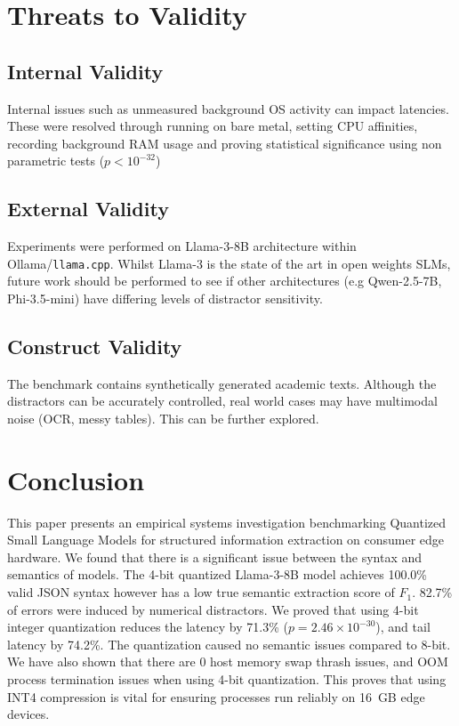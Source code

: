 \documentclass[conference]{IEEEtran}
\begin{document}
{\section{Threats to Validity}
\label{sec:validity}

\subsection{Internal Validity}
Internal issues such as unmeasured background OS activity can impact latencies. These were resolved through running on bare metal, setting CPU affinities, recording background RAM usage and proving statistical significance using non parametric tests ($p < 10^{-32}$)

\subsection{External Validity}
Experiments were performed on Llama-3-8B architecture within Ollama/\texttt{llama.cpp}. Whilst Llama-3 is the state of the art in open weights SLMs, future work should be performed to see if other architectures (e.g Qwen-2.5-7B, Phi-3.5-mini) have differing levels of distractor sensitivity.

\subsection{Construct Validity}
The benchmark contains synthetically generated academic texts. Although the distractors can be accurately controlled, real world cases may have multimodal noise (OCR, messy tables). This can be further explored.

\section{Conclusion}
\label{sec:conclusion}

This paper presents an empirical systems investigation benchmarking Quantized Small Language Models for structured information extraction on consumer edge hardware. We found that there is a significant issue between the syntax and semantics of models. The 4-bit quantized Llama-3-8B model achieves 100.0\% valid JSON syntax however has a low true semantic extraction score of $F_1$. 82.7\% of errors were induced by numerical distractors. We proved that using 4-bit integer quantization reduces the latency by 71.3\% ($p = 2.46 \times 10^{-30}$), and tail latency by 74.2\%. The quantization caused no semantic issues compared to 8-bit. We have also shown that there are 0 host memory swap thrash issues, and OOM process termination issues when using 4-bit quantization. This proves that using INT4 compression is vital for ensuring processes run reliably on 16~GB edge devices.



}
\end{document}
